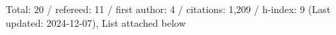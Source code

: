 Total: 20 / refereed: 11 / first author: 4 / citations: 1,209 / h-index: 9 (Last updated: 2024-12-07), List attached below